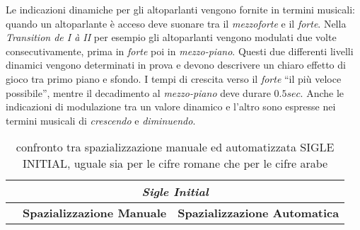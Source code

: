 Le indicazioni dinamiche per gli altoparlanti vengono fornite in termini musicali: quando un altoparlante è acceso deve suonare tra il \emph{mezzoforte} e il \emph{forte}. Nella \emph{Transition de I à II} per esempio gli altoparlanti vengono modulati due volte consecutivamente, prima in \emph{forte} poi in \emph{mezzo-piano}. Questi due differenti livelli dinamici vengono determinati in prova e devono descrivere un chiaro effetto di gioco tra primo piano e sfondo. I tempi di crescita verso il \emph{forte} “il più veloce possibile”, mentre il decadimento al \emph{mezzo-piano} deve durare $ 0.5 sec $. Anche le indicazioni di modulazione tra un valore dinamico e l'altro sono espresse nei termini musicali di \emph{crescendo} e \emph{diminuendo}.




\begin{table*}[h]

\caption{confronto tra spazializzazione manuale ed automatizzata SIGLE INITIAL, uguale sia per le cifre romane che per le cifre arabe}
\begin{center}
\begin{tabular}{c c c c c}

\hline
\multicolumn{5}{c}{\emph{\textbf{Sigle Initial}}} \\
\hline

	&
\multicolumn{2}{c}{\textbf{Spazializzazione Manuale}} &
\multicolumn{2}{c}{\textbf{Spazializzazione Automatica}} \\

\hline


\end{tabular}
\end{center}
\end{table*}

